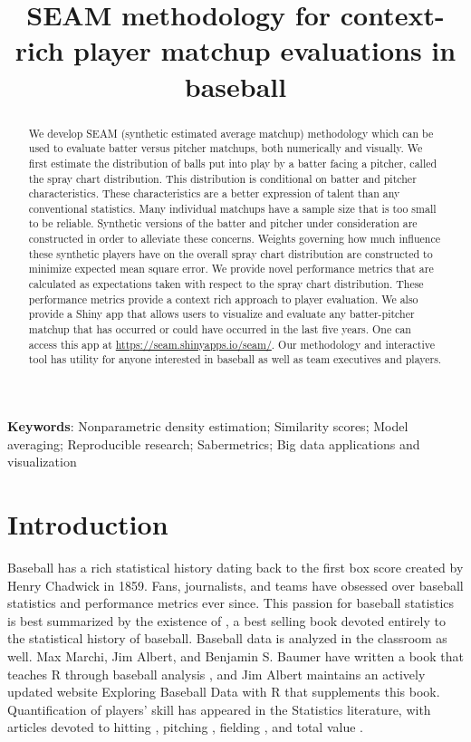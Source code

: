 \documentclass[12pt]{article}
\title{SEAM methodology for context-rich player matchup evaluations in baseball}
\date{}
\begin{document}
\maketitle

\begin{abstract}
We develop SEAM (synthetic estimated average matchup) methodology which can be used to evaluate batter versus pitcher matchups, both numerically and visually. We first estimate the distribution of balls put into play by a batter facing a pitcher, called the spray chart distribution. This distribution is conditional on batter and pitcher characteristics. These characteristics are a better expression of talent than any conventional statistics. Many individual matchups have a sample size that is too small to be reliable. Synthetic versions of the batter and pitcher under consideration are constructed in order to alleviate these concerns. Weights governing how much influence these synthetic players have on the overall spray chart distribution are constructed to minimize expected mean square error. We provide novel performance metrics that are calculated as expectations taken with respect to the spray chart distribution. These performance metrics provide a context rich approach to player evaluation. We also provide a Shiny app that allows users to visualize and evaluate any batter-pitcher matchup that has occurred or could have occurred in the last five years. One can access this app at \url{https://seam.shinyapps.io/seam/}. Our methodology and interactive tool has utility for anyone interested in baseball as well as team executives and players.
\end{abstract}

\noindent\textbf{Keywords}: Nonparametric density estimation; Similarity scores; Model averaging; Reproducible research; Sabermetrics; Big data applications and visualization


\section{Introduction}

Baseball has a rich statistical history dating back to the first box score created by Henry Chadwick in 1859. Fans, journalists, and teams have obsessed over baseball statistics and performance metrics ever since. This passion for baseball statistics is best summarized by the existence of \cite{schwarz2004numbers}, a best selling book devoted entirely to the statistical history of baseball. Baseball data is analyzed in the classroom as well. Max Marchi, Jim Albert, and Benjamin S. Baumer have written a book that teaches R through baseball analysis \citep{marchi2019analyzing}, and Jim Albert maintains an actively updated website Exploring Baseball Data with R that supplements this book. 
Quantification of players' skill has appeared in the Statistics literature, with articles devoted to
hitting \citep{berry1999bridging, albert2008streaky, brown2008season, jensen2009hierarchical},
pitching \citep{albert2006pitching, shinya2017pitching},
fielding \citep{jensen2009bayesball, piette2012estimating}, 
and total value \citep{baumer2015openwar}.
\end{document}

